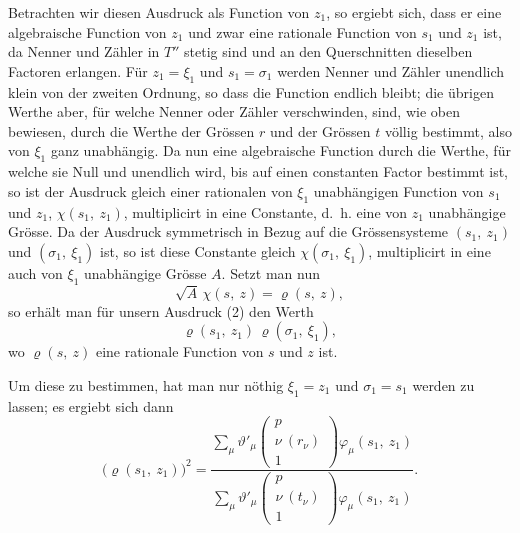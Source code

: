 \documentclass[12pt,a4paper]{book}
\theoremstyle{definition}
\theoremstyle{remark}
\begin{document}
Betrachten wir diesen Ausdruck als Function von $z_1$, so ergiebt sich, dass er eine algebraische Function von $z_1$ und zwar eine rationale Function von $s_1$ und $z_1$ ist, da Nenner und Zähler in $T''$ stetig sind und an den Querschnitten dieselben Factoren erlangen. Für $z_1 = \xi_1$ und $s_1 = \sigma_1$ werden Nenner und Zähler unendlich klein von der zweiten Ordnung, so dass die Function endlich bleibt; die übrigen Werthe aber, für welche Nenner oder Zähler verschwinden, sind, wie oben bewiesen, durch die Werthe der Grössen $r$ und der Grössen $t$ völlig bestimmt, also von $\xi_1$ ganz unabhängig. Da nun eine algebraische Function durch die Werthe, für welche sie Null und unendlich wird, bis auf einen constanten Factor bestimmt ist, so ist der Ausdruck gleich einer rationalen von $\xi_1$ unabhängigen Function von $s_1$ und $z_1$, $\chi(s_1,\ z_1)$, multiplicirt in eine Constante, d.~h. eine von $z_1$ unabhängige Grösse. Da der Ausdruck symmetrisch in Bezug auf die Grössensysteme $(s_1,\ z_1)$ und $(\sigma_1,\ \xi_1)$ ist, so ist diese Constante gleich $\chi(\sigma_1,\ \xi_1)$, multiplicirt in eine auch von $\xi_1$ unabhängige Grösse $A$. Setzt man nun
\[ \sqrt{A}\,\chi(s,\ z) = \varrho(s,\ z), \]
so erhält man für unsern Ausdruck (2) den Werth
\begin{equation}
\tag{3} \varrho(s_1,\ z_1)\,\varrho(\sigma_1,\ \xi_1), \end{equation}
wo $\varrho(s,\ z)$ eine rationale Function von $s$ und $z$ ist.

Um diese zu bestimmen, hat man nur nöthig $\xi_1 = z_1$ und $\sigma_1 = s_1$ werden zu lassen; es ergiebt sich dann
\begin{equation}
\tag{4} \bigl(\varrho(s_1,\ z_1)\bigr)^2 = \frac{\sum\limits_\mu \vartheta'_\mu\left(\begin{array}{c} p\\ \nu\ (r_\nu)\\ 1 \end{array}\right) \varphi_\mu(s_1,\ z_1)}{\sum\limits_\mu \vartheta'_\mu\left(\begin{array}{c} p\\ \nu\ (t_\nu)\\ 1 \end{array}\right) \varphi_\mu(s_1,\ z_1)}. \end{equation}
\end{document}
